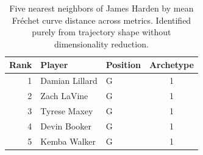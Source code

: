 \begin{table}[htbp]
  \centering\small
  \begin{tabular}{rllc}
    \toprule
    Rank & Player & Position & Archetype \\
    \midrule
    1 & Damian Lillard & G & 1 \\
    2 & Zach LaVine & G & 1 \\
    3 & Tyrese Maxey & G & 1 \\
    4 & Devin Booker & G & 1 \\
    5 & Kemba Walker & G & 1 \\
    \bottomrule
  \end{tabular}
  \caption{Five nearest neighbors of James Harden by mean Fr\'{e}chet curve distance across metrics. Identified purely from trajectory shape without dimensionality reduction.}
  \label{tab:James_Harden_frechet_curve_neighbors}
\end{table}

